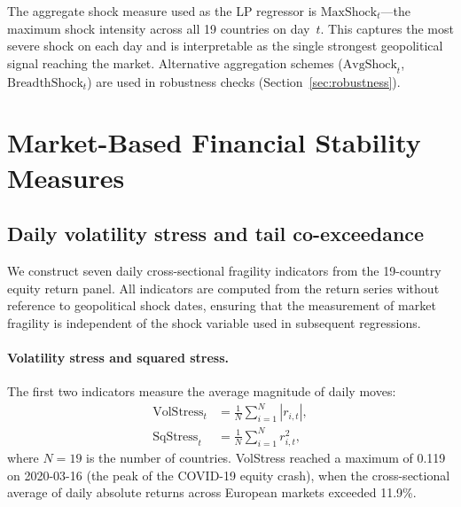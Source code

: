 \documentclass[11pt]{article}
\begin{document}
The aggregate shock measure used as the LP regressor is
$\text{MaxShock}_t$---the maximum shock intensity across all 19 countries on
day~$t$.
This captures the most severe shock on each day and is interpretable as the
single strongest geopolitical signal reaching the market.
Alternative aggregation schemes ($\text{AvgShock}_t$, $\text{BreadthShock}_t$)
are used in robustness checks (Section~\ref{sec:robustness}).

\section{Market-Based Financial Stability Measures}
\label{sec:fragility}

\subsection{Daily volatility stress and tail co-exceedance}
\label{subsec:indicators}

We construct seven daily cross-sectional fragility indicators from the
19-country equity return panel.
All indicators are computed from the return series without reference to
geopolitical shock dates, ensuring that the measurement of market fragility
is independent of the shock variable used in subsequent regressions.

\paragraph{Volatility stress and squared stress.}
The first two indicators measure the average magnitude of daily moves:
\begin{align}
  \text{VolStress}_t &= \frac{1}{N} \sum_{i=1}^{N} |r_{i,t}|, \\
  \text{SqStress}_t  &= \frac{1}{N} \sum_{i=1}^{N} r_{i,t}^2,
\end{align}
where $N=19$ is the number of countries.
VolStress reached a maximum of 0.119 on 2020-03-16 (the peak of the
COVID-19 equity crash), when the cross-sectional average of daily absolute
returns across European markets exceeded 11.9\%.
\end{document}
